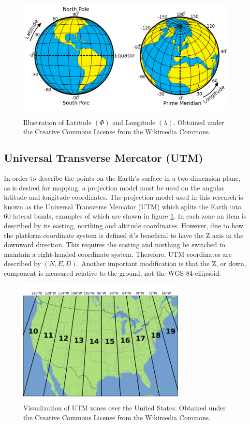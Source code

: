 \begin{figure}[tbh]
	\centering
    \includegraphics[height=2.5in]{figures/latitudelongitude.png}
    \caption[Latitude and longitude]{Illustration of Latitude $(\Phi)$ and Longitude $(\lambda)$. Obtained under the Creative Commons License from the Wikimedia Commons.}
\end{figure}

\subsection{Universal Transverse Mercator (UTM)}

In order to describe the points on the Earth's surface in a two-dimension plane, as is desired for mapping, a projection model must be used on the angular latitude and longitude coordinates.  The projection model used in this research is known as the Universal Transverse Mercator (UTM) which splits the Earth into 60 lateral bands, examples of which are shown in figure \ref{utm_zones}.  In each zone an item is described by its easting, northing and altitude coordinates.  However, due to how the platform coordinate system is defined it's beneficial to have the Z axis in the downward direction.  This requires the easting and northing be switched to maintain a right-handed coordinate system. Therefore, UTM coordinates are described by $(N,E,D)$.  Another important modification is that the Z, or down, component is measured relative to the ground, not the WGS-84 ellipsoid. 

\begin{figure}[tbh]
	\centering
    \includegraphics[height=2.5in]{figures/utm_zones.png}
    \caption[UTM zones]{Visualization of UTM zones over the United States. Obtained under the Creative Commons License from the Wikimedia Commons.}
    \label{utm_zones}
\end{figure}

